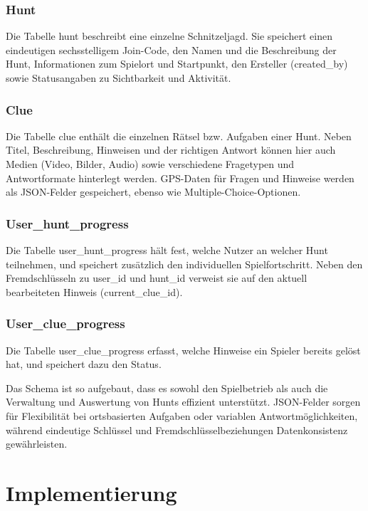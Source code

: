 \documentclass[oneside]{ausarbeitung}
\begin{document}
\subsection{Hunt}

Die Tabelle hunt beschreibt eine einzelne Schnitzeljagd. Sie speichert einen eindeutigen sechsstelligem Join-Code, den Namen und die Beschreibung der Hunt, Informationen zum Spielort und Startpunkt, den Ersteller (created\_by) sowie Statusangaben zu Sichtbarkeit und Aktivität.

\subsection{Clue}

Die Tabelle clue enthält die einzelnen Rätsel bzw. Aufgaben einer Hunt. Neben Titel, Beschreibung, Hinweisen und der richtigen Antwort können hier auch Medien (Video, Bilder, Audio) sowie verschiedene Fragetypen und Antwortformate hinterlegt werden. GPS-Daten für Fragen und Hinweise werden als JSON-Felder gespeichert, ebenso wie Multiple-Choice-Optionen.

\subsection{User\_hunt\_progress}
Die Tabelle user\_hunt\_progress hält fest, welche Nutzer an welcher Hunt teilnehmen, und speichert zusätzlich den individuellen Spielfortschritt. Neben den Fremdschlüsseln zu user\_id und hunt\_id verweist sie auf den aktuell bearbeiteten Hinweis (current\_clue\_id).

\subsection{User\_clue\_progress}
Die Tabelle user\_clue\_progress erfasst, welche Hinweise ein Spieler bereits gelöst hat, und speichert dazu den Status.

\vspace{2em}
Das Schema ist so aufgebaut, dass es sowohl den Spielbetrieb als auch die Verwaltung und Auswertung von Hunts effizient unterstützt. JSON-Felder sorgen für Flexibilität bei ortsbasierten Aufgaben oder variablen Antwortmöglichkeiten, während eindeutige Schlüssel und Fremdschlüsselbeziehungen Datenkonsistenz gewährleisten.
\chapter{Implementierung}
\label{cha:implementierung}
\end{document}
